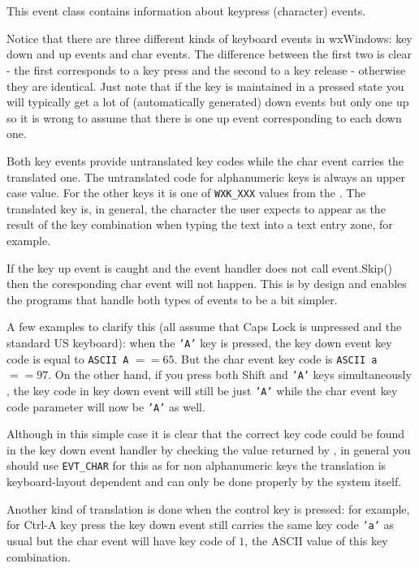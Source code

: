 \section{}\label{wxkeyevent}

This event class contains information about keypress (character) events.

Notice that there are three different kinds of keyboard events in wxWindows:
key down and up events and char events. The difference between the first two
is clear - the first corresponds to a key press and the second to a key
release - otherwise they are identical. Just note that if the key is
maintained in a pressed state you will typically get a lot of (automatically
generated) down events but only one up so it is wrong to assume that there is
one up event corresponding to each down one.

Both key events provide untranslated key codes while the char event carries
the translated one. The untranslated code for alphanumeric keys is always
an upper case value. For the other keys it is one of {\tt WXK\_XXX} values
from the . The translated key is, in
general, the character the user expects to appear as the result of the key
combination when typing the text into a text entry zone, for example.

If the key up event is caught and the event handler does not call
event.Skip() then the coresponding char event will not happen.  This
is by design and enables the programs that handle both types of events
to be a bit simpler.

A few examples to clarify this (all assume that {\sc Caps Lock} is unpressed
and the standard US keyboard): when the {\tt 'A'} key is pressed, the key down
event key code is equal to {\tt ASCII A} $== 65$. But the char event key code
is {\tt ASCII a} $== 97$. On the other hand, if you press both {\sc Shift} and
{\tt 'A'} keys simultaneously , the key code in key down event will still be
just {\tt 'A'} while the char event key code parameter will now be {\tt 'A'}
as well.

Although in this simple case it is clear that the correct key code could be
found in the key down event handler by checking the value returned by
, in general you should use
{\tt EVT\_CHAR} for this as for non alphanumeric keys the translation is
keyboard-layout dependent and can only be done properly by the system itself.

Another kind of translation is done when the control key is pressed: for
example, for {\sc Ctrl-A} key press the key down event still carries the
same key code {\tt 'a'} as usual but the char event will have key code of
$1$, the ASCII value of this key combination.

